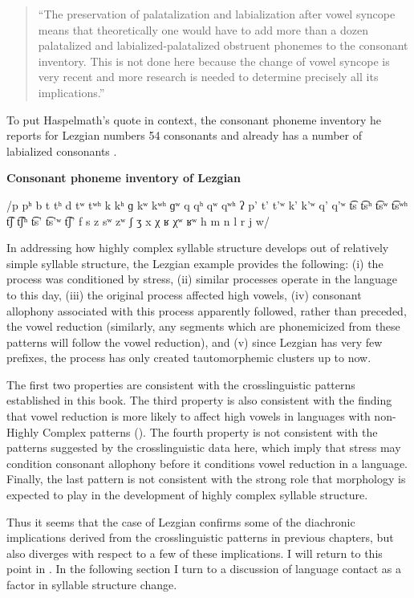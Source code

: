 \begin{quote}
“The preservation of palatalization and labialization after vowel syncope means that theoretically one would have to add more than a dozen palatalized and labialized-palatalized obstruent phonemes to the consonant inventory. This is not done here because the change of vowel syncope is very recent and more research is needed to determine precisely all its implications.”
\citep[38]{Haspelmath1993}
\end{quote}

To put Haspelmath’s quote in context, the consonant phoneme inventory he reports for Lezgian numbers 54 consonants and already has a number of labialized consonants .

\ea\label{ex:8.4}
  \textbf{Consonant phoneme inventory of Lezgian}

/p pʰ b t tʰ d tʷ tʷʰ k kʰ ɡ kʷ kʷʰ ɡʷ q qʰ qʷ qʷʰ ʔ p’ t’ t’ʷ k’ k’ʷ q’ q’ʷ t͡s t͡sʰ t͡sʷ t͡sʷʰ t͡ʃ t͡ʃʰ t͡s’ t͡s’ʷ t͡ʃ’ f s z sʷ zʷ ʃ ʒ x χ ʁ χʷ ʁʷ h m n l r j w/
\z

  In addressing how highly complex syllable structure develops out of relatively simple syllable structure, the Lezgian example provides the following: (i) the process was conditioned by stress, (ii) similar processes operate in the language to this day, (iii) the original process affected high vowels, (iv) consonant allophony associated with this process apparently followed, rather than preceded, the vowel reduction (similarly, any segments which are phonemicized from these patterns will follow the vowel reduction), and (v) since Lezgian has very few prefixes, the process has only created tautomorphemic clusters up to now. 

  The first two properties are consistent with the crosslinguistic patterns established in this book. The third property is also consistent with the finding that vowel reduction is more likely to affect high vowels in languages with non-Highly Complex patterns (). The fourth property is not consistent with the patterns suggested by the crosslinguistic data here, which imply that stress may condition consonant allophony before it conditions vowel reduction in a language. Finally, the last pattern is not consistent with the strong role that morphology is expected to play in the development of highly complex syllable structure.

  Thus it seems that the case of Lezgian confirms some of the diachronic implications derived from the crosslinguistic patterns in previous chapters, but also diverges with respect to a few of these implications. I will return to this point in . In the following section I turn to a discussion of language contact as a factor in syllable structure change.

